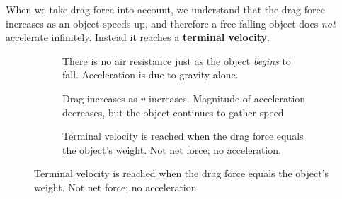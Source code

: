 When we take drag force into account, we understand that the drag force
increases as an object speeds up, and therefore a free-falling object does
\emph{not} accelerate infinitely. Instead it reaches a
\textbf{terminal velocity}.

\begin{figure}[ht]
  \centering
  \begin{subfigure}{.31\textwidth}
    \centering
    \caption{There is no air resistance just as the object \emph{begins}
      to fall. Acceleration is due to gravity alone.}
  \end{subfigure}
  \begin{subfigure}{.31\textwidth}
    \centering
    \caption{Drag increases as $v$ increases. Magnitude of acceleration
      decreases, but the object continues to gather speed}
  \end{subfigure}
  \begin{subfigure}{.31\textwidth}
    \centering
    \caption{Terminal velocity is reached when the drag force equals the
      object's weight. Not net force; no acceleration.}
  \end{subfigure}
\end{figure}




